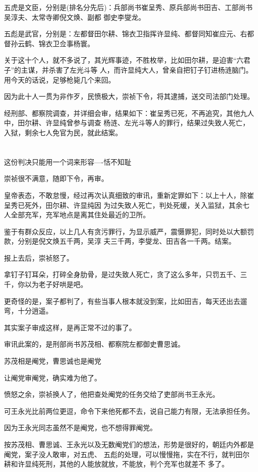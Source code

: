 \documentclass[11pt,a4paper,onecolumn]{article}
\begin{document}
五虎是文臣，分别是(排名分先后)：兵部尚书崔呈秀、原兵部尚书田吉、工部尚书吴淳夫、太常寺卿倪文焕、副都
御史李燮龙。

五彪是武官，分别是：左都督田尔耕、锦衣卫指挥许显纯、都督同知崔应元、右都督孙云鹤、锦衣卫佥事杨寰。

关于这十个人，就不多说了，其光辉事迹，不胜枚举，比如田尔耕，是迫害``六君子''的主谋，并杀害了左光斗等
人，而许显纯大人，曾亲自把钉子钉进杨涟脑门。用今天的话说，足够枪毙几个来回。

因为此十人一贯为非作歹，民愤极大，崇祯下令，将其逮捕，送交司法部门处理。

经刑部、都察院调查，并详细会审，结果如下：崔呈秀已死，不再追究，其他九人中，田尔耕、许显纯曾参与调查
杨涟、左光斗等人的罪行，结果过失致人死亡，入狱，剩余七人免官为民，就此结案。

\section[\thesection]{}

这份判决只能用一个词来形容----恬不知耻

崇祯很不满意，随即下令，再审。

皇帝表态，不敢怠慢，经过再次认真细致的审讯，重新定罪如下：以上十人，除崔呈秀已死外，田尔耕、许显纯因
为过失致人死亡，判处死缓，关入监狱，其余七人全部充军，充军地点是离其住处最近的卫所。

鉴于有群众反应，以上几人有贪污罪行，为显示威严，震慑罪犯，同时处以大额罚款，分别是倪文焕五千两，吴淳
夫三千两，李燮龙、田吉各一千两。结案。

报上去后，崇祯怒了。

拿钉子钉耳朵，打碎全身肋骨，是过失致人死亡，贪了这么多年，只罚五千、三千，你以为老子好哄是吧。

更奇怪的是，案子都判了，有些当事人根本就没到案，比如田吉，每天还出去遛弯，十分逍遥。

其实案子审成这样，是再正常不过的事了。

审讯此案的，是刑部尚书苏茂相、都察院左都御史曹思诚。

苏茂相是阉党，曹思诚也是阉党

让阉党审阉党，确实难为他了。

愤怒之余，崇祯换人了，他把查处阉党的任务交给了吏部尚书王永光。

可王永光比前两位更逗，命令下来他死都不去，说自己能力有限，无法承担任务。

因为王永光同志虽然不是阉党，也不想得罪阉党。

按苏茂相、曹思诚、王永光以及无数阉党们的想法，形势是很好的，朝廷内外都是阉党，案子没人敢审，对五虎、
五彪的处理，可以慢慢拖，实在不行，就判田尔耕和许显纯死刑，其他的人能放就放，不能放，判个充军也就差不
多了。
\end{document}
